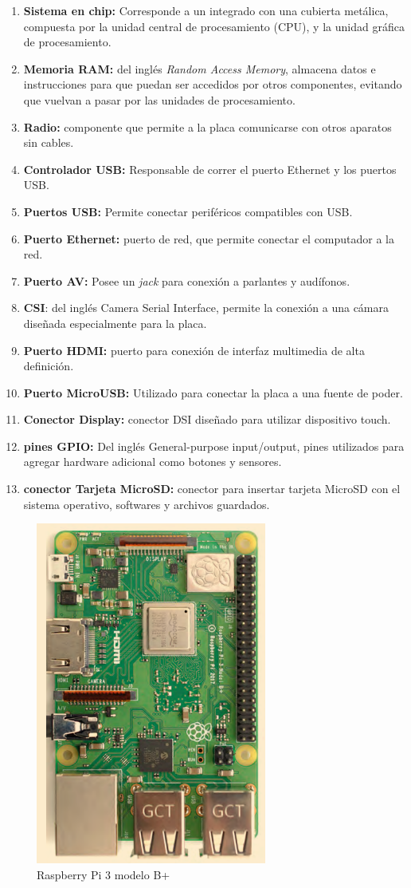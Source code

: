 \begin{enumerate}
\item \textbf{Sistema en chip:} Corresponde a un integrado con una cubierta metálica, compuesta por la unidad central de procesamiento (CPU), y la unidad gráfica de procesamiento.
\item \textbf{Memoria RAM:} del inglés \textit{Random Access Memory}, almacena datos e instrucciones para que puedan ser accedidos por otros componentes, evitando que vuelvan a pasar por las unidades de procesamiento.
\item \textbf{Radio:} componente que permite a la placa comunicarse con otros aparatos sin cables.
\item \textbf{Controlador USB:} Responsable de correr el puerto Ethernet y los puertos USB.
\item \textbf{Puertos USB:} Permite conectar periféricos compatibles con USB.
\item \textbf{Puerto Ethernet:} puerto de red, que permite conectar el computador a la red.
\item \textbf{Puerto AV:} Posee un \textit{jack} para conexión a parlantes y audífonos.
\item \textbf{CSI}: del inglés Camera Serial Interface, permite la conexión a una cámara diseñada especialmente para la placa.
\item \textbf{Puerto HDMI:} puerto para conexión de interfaz multimedia de alta definición.
\item \textbf{Puerto MicroUSB:} Utilizado para conectar la placa a una fuente de poder.
\item \textbf{Conector Display:} conector DSI diseñado para utilizar dispositivo touch.
\item \textbf{pines GPIO:} Del inglés General-purpose input/output, pines utilizados para agregar hardware adicional como botones y sensores.
\item \textbf{conector Tarjeta MicroSD:} conector para insertar tarjeta MicroSD con el sistema operativo, softwares y archivos guardados.


\end{enumerate}



\begin{figure}
\centering
\includegraphics[scale=0.9]{images/rbpi.png}
\caption{Raspberry Pi 3 modelo B+ \parencite{gareth2018}}
\end{figure}
 





